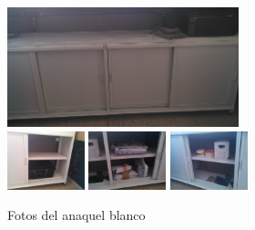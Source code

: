 \documentclass[a4paper,11pt]{article}                 %
\begin{document}
    \begin{figure}[H]
      \centering                            
      \includegraphics[width=0.6\textwidth]{images/anaquel-blanco-01} \\
      \includegraphics[width=0.2\textwidth]{images/anaquel-blanco-02}
      \includegraphics[width=0.2\textwidth]{images/anaquel-blanco-03}
      \includegraphics[width=0.2\textwidth]{images/anaquel-blanco-04} 
      \caption{Fotos del anaquel blanco}                       
    \end{figure}
\end{document}
